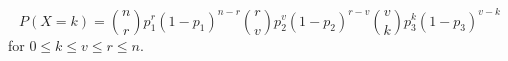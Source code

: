 $$P(X = k) = \binom{n}{r}p_{1}^{r}(1-p_{1})^{n-r}\binom{r}{v}p_{2}^{v}(1-p_{2})^
{r-v}\binom{v}{k}p_{3}^{k}(1-p_{3})^
{v-k}$$ for $0 \leq k \leq v \leq r \leq n$.